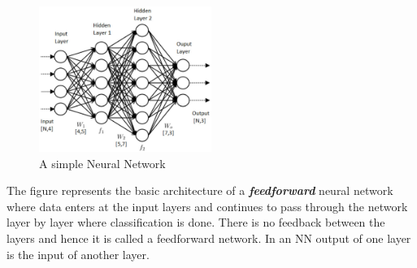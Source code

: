 \begin{figure}
    \centering
    \includegraphics[width=0.5\textwidth]{thesis_template/images/ANN.png}
    \caption{A simple Neural Network}
    \label{}
\end{figure}
\noindent The figure represents the basic architecture of a \textit{\textbf{feedforward}} neural network where data enters at the input layers and continues to pass through the network layer by layer where classification is done. There is no feedback between the layers and hence it is called a feedforward network. In an NN output of one layer is the input of another layer.
